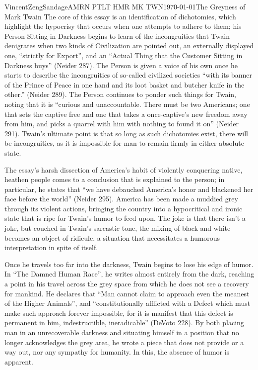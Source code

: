\documentclass{article}[12pt]
\begin{document}
\begin{mla}{Vincent}{Zeng}{Sandage}{AMRN PTLT HMR MK TWN}{\today}{The Greyness of Mark Twain}
The core of this essay is an identification of dichotomies, which highlight the hypocrisy that occurs when one attempts to adhere to them; his Person Sitting in Darkness begins to learn of the incongruities that Twain denigrates when two kinds of Civilization are pointed out, an externally displayed one, ``strictly for Export'', and an ``Actual Thing that the Customer Sitting in Darkness buys'' (Neider 287). The Person is given a voice of his own once he starts to describe the incongruities of so-called civilized societies ``with its banner of the Prince of Peace in one hand and its loot basket and butcher knife in the other.'' (Neider 289).  The Person continues to ponder such things for Twain, noting that it is ``curious and unaccountable. There must be two Americans; one that sets the captive free and one that takes a once-captive's new freedom away from him, and picks a quarrel with him with nothing to found it on'' (Neider 291). Twain's ultimate point is that so long as such dichotomies exist, there will be incongruities, as it is impossible for man to remain firmly in either absolute state.

The essay's harsh dissection of America's habit of violently conquering native, heathen people comes to a conclusion that is explained to the person; in particular, he states that ``we have debauched America's honor and blackened her face before the world'' (Neider 295). America has been made a muddied grey through its violent actions, bringing the country into a hypocritical and ironic state that is ripe for Twain's humor to feed upon. The joke is that there isn't a joke, but couched in Twain's sarcastic tone, the mixing of black and white becomes an object of ridicule, a situation that necessitates a humorous interpretation in spite of itself.

Once he travels too far into the darkness, Twain begins to lose his edge of humor. In ``The Damned Human Race'', he writes almost entirely from the dark, reaching a point in his travel across the grey space from which he does not see a recovery for mankind. He declares that ``Man cannot claim to approach even the meanest of the Higher Animals'', and ``constitutionally afflicted with a Defect which must make such approach forever impossible, for it is manifest that this defect is permanent in him, indestructible, ineradicable'' (DeVoto 228). By both placing man in an unrecoverable darkness and situating himself in a position that no longer acknowledges the grey area, he wrote a piece that does not provide or a way out, nor any sympathy for humanity. In this, the absence of humor is apparent.


\end{mla}
\end{document}
